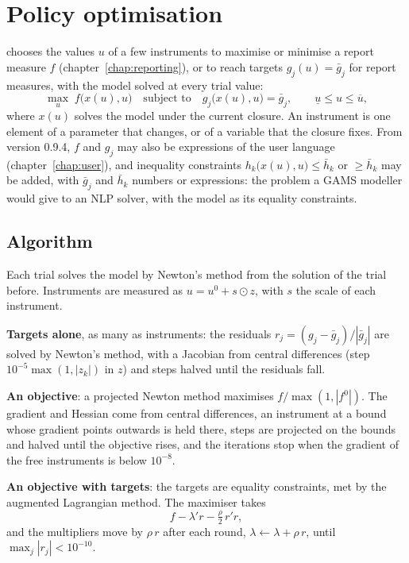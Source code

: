 \chapter{Policy optimisation}\label{chap:optimize}

 chooses the values $u$ of a few instruments to maximise or
minimise a report measure $f$ (chapter~\ref{chap:reporting}), or to reach
targets $g_j(u) = \bar g_j$ for report measures, with the model solved at every
trial value:
\begin{equation*}
\max_u\; f\bigl(x(u), u\bigr) \quad \text{subject to} \quad
g_j\bigl(x(u), u\bigr) = \bar g_j, \qquad \underline u \le u \le \overline u,
\end{equation*}
where $x(u)$ solves the model under the current closure. An instrument is one
element of a parameter that  changes, or of a variable that
the closure fixes. From version 0.9.4, $f$ and $g_j$ may also be expressions of
the user language (chapter~\ref{chap:user}), and inequality constraints
$h_k\bigl(x(u), u\bigr) \le \bar h_k$ or $\ge \bar h_k$ may be added, with
$\bar g_j$ and $\bar h_k$ numbers or expressions: the problem a GAMS modeller
would give to an NLP solver, with the model as its equality constraints.

\section{Algorithm}

Each trial solves the model by Newton's method from the solution of the trial
before. Instruments are measured as $u = u^0 + s \odot z$, with $s$ the scale of
each instrument.

\textbf{Targets alone}, as many as instruments: the residuals
$r_j = (g_j - \bar g_j)/|\bar g_j|$ are solved by Newton's method, with a
Jacobian from central differences (step $10^{-5}\max(1, |z_k|)$ in $z$) and steps halved
until the residuals fall.

\textbf{An objective}: a projected Newton method maximises $f / \max(1,
|f^0|)$. The gradient and Hessian come from central differences, an
instrument at a bound whose gradient points outwards is held there, steps are
projected on the bounds and halved until the objective rises, and the
iterations stop when the gradient of the free instruments is below $10^{-8}$.

\textbf{An objective with targets}: the targets are equality constraints, met
by the augmented Lagrangian method. The maximiser takes
\begin{equation*}
f - \lambda' r - \tfrac{\rho}{2}\,r'r,
\end{equation*}
and the multipliers move by $\rho\,r$ after each round, $\lambda \leftarrow
\lambda + \rho\,r$, until $\max_j |r_j| < 10^{-10}$.

